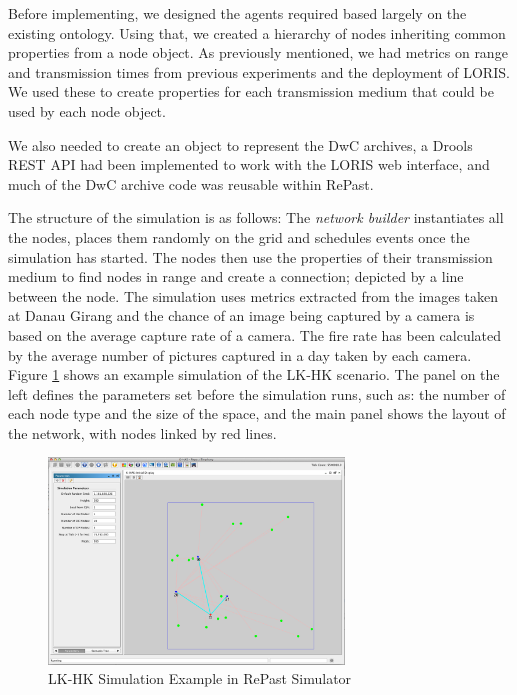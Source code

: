 Before implementing, we designed the agents required based largely on the existing ontology. Using that, we created a hierarchy of nodes inheriting common properties from a node object. As previously mentioned, we had metrics on range and transmission times from previous experiments and the deployment of LORIS. We used these to create properties for each transmission medium that could be used by each node object.

We also needed to create an object to represent the DwC archives, a Drools REST API had been implemented to work with the LORIS web interface, and much of the DwC archive code was reusable within RePast. 

The structure of the simulation is as follows: The \textit{network builder} instantiates all the nodes, places them randomly on the grid and schedules events once the simulation has started. The nodes then use the properties of their transmission medium to find nodes in range and create a connection; depicted by a line between the node. The simulation uses metrics extracted from the images taken at Danau Girang and the chance of an image being captured by a camera is based on the average capture rate of a camera. The fire rate has been calculated by the average number of pictures captured in a day taken by each camera. Figure \ref{fig:sim} shows an example simulation of the LK-HK scenario. The panel on the left defines the parameters set before the simulation runs, such as: the number of each node type and the size of the space, and the main panel shows the layout of the network, with nodes linked by red lines.


	\begin{figure}[h]
	\centering
	\includegraphics[width=0.70\textwidth]{Chap7/figures/khas_sim}
	\caption{LK-HK Simulation Example in RePast Simulator}
	\label{fig:sim}
	\end{figure}


